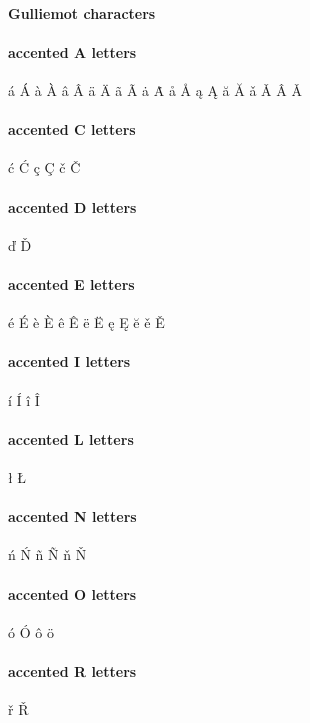 \documentclass[14pt]{article}%
\begin{document}
\paragraph{Gulliemot characters}
\guillemotleft
\guillemotright
\guilsinglleft
\guilsinglright


\paragraph{accented A letters}
\'{a}
\'{A}
\`{a}
\`{A}
\^{a}
\^{A}
\"{a}
\"{A}
\~{a}
\~{A}
\.{a}
\.{A}
\aa
\AA
\k{a}
\k{A}
\u{a}
\u{A}
\v{a}
\v{A}
\^{A}
\v{A}

\paragraph{accented C letters}
\'{c}
\'{C}
\c{c}
\c{C}
\v{c}
\v{C}

\paragraph{accented D letters}
\v{d}
\v{D}

\paragraph{accented E letters}
\'{e}
\'{E}
\`{e}
\`{E}
\^{e}
\^{E}
\"{e}
\"{E}
\k{e}
\k{E}
\u{e}
\v{e}
\v{E}

\paragraph{accented I letters}
\'{i}
\'{I}
\^{i}
\^{I}

\paragraph{accented L letters}
\l
\L

\paragraph{accented N letters}
\'{n}
\'{N}
\~{n}
\~{N}
\v{n}
\v{N}

\paragraph{accented O letters}
\'{o}
\'{O}
\^{o}
\"{o}

\paragraph{accented R letters}
\v{r}
\v{R}
\end{document}
